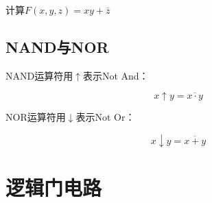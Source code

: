 \documentclass[12pt, openany, oneside]{book}
\begin{document}
\begin{tcolorbox}
	计算$ F(x, y, z) = xy + \overline z $
	\begin{table}[H]
		\centering
	\end{table}
\end{tcolorbox}

\vspace{0.5cm}

\subsection{NAND与NOR}

NAND运算符用$ \uparrow $表示Not And：

\vspace{-0.5cm}

$$
	x \uparrow y = \overline{x \cdot y}
$$

NOR运算符用$ \downarrow $表示Not Or：

\vspace{-0.5cm}

$$
	x \downarrow y = \overline{x + y}
$$

\newpage

\section{逻辑门电路}
\end{document}
